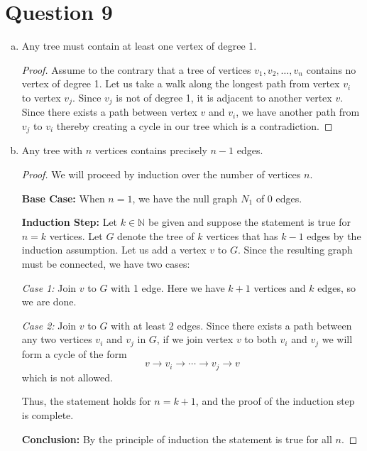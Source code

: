 \documentclass[11pt, oneside]{article}   	%
\begin{document}
\section*{Question 9}
\begin{enumerate}[(a)]

\item Any tree must contain at least one vertex of degree 1.
\begin{proof}
Assume to the contrary that a tree of vertices $v_1, v_2, \ldots , v_n$ contains no vertex of degree 1. Let us take a walk along the longest path from vertex $v_i$ to vertex $v_j$. Since $v_j$ is not of degree 1, it is adjacent to another vertex $v$. Since there exists a path between vertex $v$ and $v_i$, we have another path from $v_j$ to $v_i$ thereby creating a cycle in our tree which is a contradiction.
\end{proof}

\item Any tree with $n$ vertices contains precisely $n-1$ edges.
\begin{proof}
We will proceed by induction over the number of vertices $n$.

\textbf{Base Case:} When $n=1$, we have the null graph $N_1$ of 0 edges.

\textbf{Induction Step:} Let $k \in \mathbb{N}$ be given and suppose the statement is true for $n=k$ vertices. Let $G$ denote the tree of $k$ vertices that has $k-1$ edges by the induction assumption. Let us add a vertex $v$ to $G$. Since the resulting graph must be connected, we have two cases:

\emph{Case 1:} Join $v$ to $G$ with 1 edge. Here we have $k+1$ vertices and $k$ edges, so we are done.

\emph{Case 2:} Join $v$ to $G$ with at least 2 edges. Since there exists a path between any two vertices $v_i$ and $v_j$ in $G$, if we join vertex $v$ to both $v_i$ and $v_j$ we will form a cycle of the form
$$v\rightarrow v_i\rightarrow \cdots \rightarrow v_j \rightarrow v$$
which is not allowed.

Thus, the statement holds for $n=k+1$, and the proof of the induction step is complete.

\textbf{Conclusion:} By the principle of induction the statement is true for all $n$.

\end{proof}

\end{enumerate}
\end{document}

